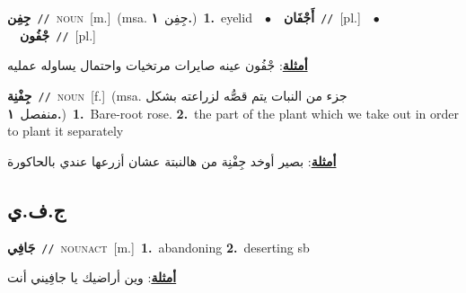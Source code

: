 \documentclass[10pt,a4paper,twoside]{article} %
\begin{document}
\begin{multicols}{2}
{\setlength\topsep{0pt}\textbf{\foreignlanguage{arabic}{جِفِن}}\ {\color{gray}\texttt{//}\color{black}}\ \textsc{noun}\ [m.]\ \color{gray}(msa. \foreignlanguage{arabic}{جِفِن}~\foreignlanguage{arabic}{\textbf{١.}})\color{black}\ \textbf{1.}~eyelid\ \ $\bullet$\ \ \setlength\topsep{0pt}\textbf{\foreignlanguage{arabic}{أَجْفَان}}\ {\color{gray}\texttt{//}\color{black}}\ [pl.]\ \ $\bullet$\ \ \setlength\topsep{0pt}\textbf{\foreignlanguage{arabic}{جْفُون}}\ {\color{gray}\texttt{//}\color{black}}\ [pl.]\  \begin{flushright}\color{gray}\foreignlanguage{arabic}{\textbf{\underline{\foreignlanguage{arabic}{أمثلة}}}: جْفُون عينه صايرات مرتخيات واحتمال يساوله عمليه}\end{flushright}\color{black}} \vspace{2mm}

{\setlength\topsep{0pt}\textbf{\foreignlanguage{arabic}{جِفْنِة}}\ {\color{gray}\texttt{//}\color{black}}\ \textsc{noun}\ [f.]\ \color{gray}(msa. \foreignlanguage{arabic}{جزء من النبات يتم قصُّه لزراعته بشكل منفصل}~\foreignlanguage{arabic}{\textbf{١.}})\color{black}\ \textbf{1.}~Bare-root rose.  \textbf{2.}~the part of the plant which we take out in order to plant it separately\  \begin{flushright}\color{gray}\foreignlanguage{arabic}{\textbf{\underline{\foreignlanguage{arabic}{أمثلة}}}: بصير أوخد جِفْنِة من هالنبتة عشان أزرعها عندي بالحاكورة}\end{flushright}\color{black}} \vspace{2mm}

\vspace{-3mm}
\subsection*{\color{blue}\foreignlanguage{arabic}{ج.ف.ي}\color{blue}{}} 

{\setlength\topsep{0pt}\textbf{\foreignlanguage{arabic}{جَافِي}}\ {\color{gray}\texttt{//}\color{black}}\ \textsc{noun\textunderscore act}\ [m.]\ \textbf{1.}~abandoning  \textbf{2.}~deserting sb\  \begin{flushright}\color{gray}\foreignlanguage{arabic}{\textbf{\underline{\foreignlanguage{arabic}{أمثلة}}}: وين أراضيك يا جافِيني أنت}\end{flushright}\color{black}} \vspace{2mm}


\end{multicols}
\end{document}
